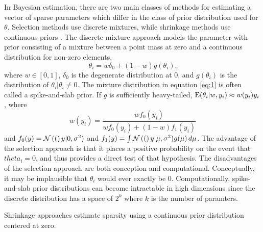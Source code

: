 \documentclass{article}
\begin{document}
In Bayesian estimation, there are two main classes of methods for estimating a vector of sparse parameters which differ in the class of prior distribution used for $\theta$. 
Selection methods use discrete mixtures, while shrinkage methods use continuous priors \parencite[73]{CarvalhoPolsonScott2009}. 
The discrete-mixture approach models the parameter with prior consisting of a mixture between a point mass at zero and a continuous distribution for non-zero elements,
\begin{equation}
  \label{eq:1}
  \theta_{i} = w \delta_{0} +  (1 - w) g(\theta_{i}) \text{,}
\end{equation}
where $w \in [0, 1]$, $\delta_{0}$ is the degenerate distribution at 0, and $g(\theta_{i})$ is the distribution of $\theta_{i} | \theta_{i} \neq 0$.
The mixture distribution in equation \eqref{eq:1} is often called a spike-and-slab prior.
If $g$ is sufficiently heavy-tailed, $\operatorname{E}(\theta_{i} | w, y_{i}) \approx w(y_{i}) y_{i}$ \textcite{PolsonScott2010}, where 
\begin{equation}
  \label{eq:7}
  w(y_{i})  = \frac{w f_{0}(y_{i})}{w f_{0}(y_{i}) + (1 - w) f_{1}(y_{i})}
\end{equation}
and $f_{0}(y) = \mathcal{N}\left((\right)y | 0, \sigma^{2})$ and $f_{1}(y) = \int \mathcal{N}\left((\right)y | \mu, \sigma^{2}) g(\mu) \,d \mu$.
The advantage of the selection approach is that it places a positive probability on the event that $theta_{i} = 0$, and thus provides a direct test of that hypothesis.
The disadvantages of the selection approach are both conception and computational.
Conceptually, it may be implausible that $\theta_{i}$ would ever exactly be 0.
Computationally, spike-and-slab prior distributions can become intractable in high dimensions since the discrete distribution has a space of $2^{k}$ where $k$ is the number of paramters.

Shrinkage approaches estimate sparsity using a continuous prior distribution centered at zero.
\end{document}
